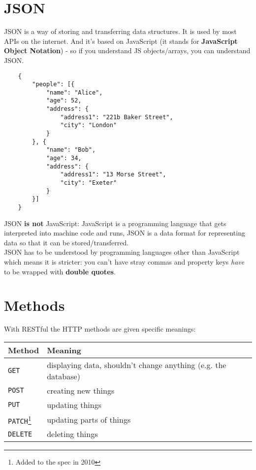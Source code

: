 \section{JSON}

JSON is a way of storing and transferring data structures. It is used by most APIs on the internet. And it's based on JavaScript (it stands for \textbf{JavaScript Object Notation}) - so if you understand JS objects/arrays, you can understand JSON.

\begin{verbatim}
    {
        "people": [{
            "name": "Alice",
            "age": 52,
            "address": {
                "address1": "221b Baker Street",
                "city": "London"
            }
        }, {
            "name": "Bob",
            "age": 34,
            "address": {
                "address1": "13 Morse Street",
                "city": "Exeter"
            }
        }]
    }
\end{verbatim}

JSON \textbf{is not} JavaScript: JavaScript is a programming language that gets interpreted into machine code and runs, JSON is a data format for representing data so that it can be stored/transferred.
\\

JSON has to be understood by programming languages other than JavaScript which means it is stricter: you can't have stray commas and property keys \textit{have} to be wrapped with \textbf{double quotes}.




\section{Methods}

With RESTful the HTTP methods are given specific meanings:
\\

\begin{tabularx}{\textwidth}{| l | X |}
    \hline
    \textbf{Method} & \textbf{Meaning} \\
    \hline
    \texttt{GET} & displaying data, shouldn't change anything (e.g. the database)\\
    \texttt{POST} & creating new things\\
    \texttt{PUT} & updating things\\
    \texttt{PATCH}\footnote{Added to the spec in 2010} & updating parts of things\\
    \texttt{DELETE} & deleting things\\
    \hline
\end{tabularx}



